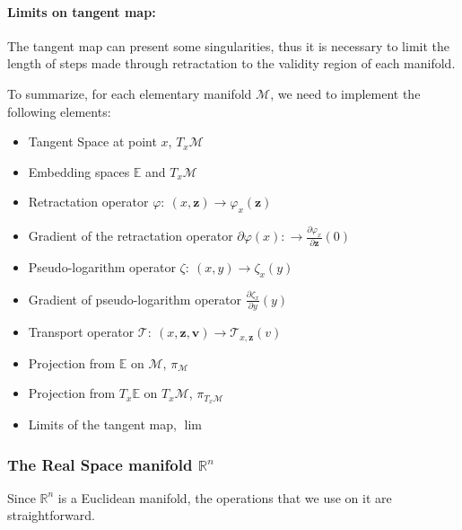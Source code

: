 \paragraph{Limits on tangent map:} The tangent map can present some singularities, thus it is necessary to limit the length of steps made through retractation to the validity region of each manifold.

To summarize, for each elementary manifold $\mathcal{M}$, we need to implement the following elements:
\begin{itemize}
  \item Tangent Space at point $x$, $T_x\mathcal{M}$
  \item Embedding spaces $\mathbb{E}$ and $T_x\mathcal{M}$
  \item Retractation operator $\varphi:\ (x,\mathbf{z}) \rightarrow \varphi_x(\mathbf{z})$
  \item Gradient of the retractation operator $\partial \varphi(x):\rightarrow \frac{\partial \varphi_x}{\partial \mathbf{z}}(0)$
  \item Pseudo-logarithm operator $\zeta:\ (x,y) \rightarrow \zeta_x(y)$
  \item Gradient of pseudo-logarithm operator $\frac{\partial \zeta_x}{\partial y}(y)$
  \item Transport operator $\mathcal{T}:\ (x,\mathbf{z}, \mathbf{v})\rightarrow \mathcal{T}_{x,\mathbf{z}}(v)$
  \item Projection from $\mathbb{E}$ on $\mathcal{M}$, $\pi_\mathcal{M}$
  \item Projection from $T_x\mathbb{E}$ on $T_x\mathcal{M}$, $\pi_{T_x\mathcal{M}}$
  \item Limits of the tangent map, $\lim$
\end{itemize}

\subsubsection{The Real Space manifold $\mathbb{R}^n$}
\label{ssub:the_real_space}
Since $\mathbb{R}^n$ is a Euclidean manifold, the operations that we use on it are straightforward.

